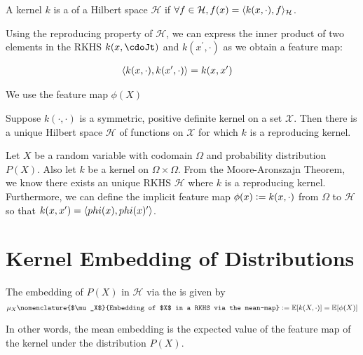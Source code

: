 \begin{definition}
	A kernel $k$ is a  of a Hilbert space $\mathcal{H}$ if $\forall f \in \mathcal{H}, f(x) = \langle k(x, \cdot), f\rangle_\mathcal{H}$.
\end{definition}

Using the reproducing property of $\mathcal{H}$, we can express the inner product of two elements in the RKHS $k(x, \cdoJt)$ and $k(x^\prime, \cdot)$ as we obtain a feature map:

\begin{align}
	\langle k(x, \cdot), k(x^\prime, \cdot)\rangle &= k(x, x^\prime)
\end{align}

We use the feature map $\phi(X)$



\begin{theorem}
Suppose $k(\cdot, \cdot)$ is a symmetric, positive definite kernel on a set $\mathcal{X}$. Then there is a unique Hilbert space $\mathcal{H}$ of functions on $\mathcal{X}$ for which $k$ is a reproducing kernel.
\end{theorem}

Let $X$ be a random variable with codomain $\Omega$ and probability distribution $P(X)$. Also let $k$ be a kernel on $\Omega \times \Omega$. From the Moore-Aronszajn Theorem, we know there exists an unique RKHS $\mathcal{H}$ where $k$ is a reproducing kernel. Furthermore, we can define the implicit feature map $\phi(x) \vcentcolon= k(x, \cdot)$ from $\Omega$ to $\mathcal{H}$ so that $k(x, x^\prime) = \langle phi(x), phi(x)^\prime\rangle$.

\section{Kernel Embedding of Distributions}

\begin{definition}
The embedding of $P(X)$ in $\mathcal{H}$ via the  is given by
\begin{equation}
  \mu_{X}\nomenclature{$\mu_X$}{Embedding of $X$ in a RKHS via the mean-map} \defeq \E[k(X, \cdot)] = \E[\phi(X)]
\end{equation}
\end{definition}

In other words, the mean embedding is the expected value of the feature map of the kernel under the distribution $P(X)$.

